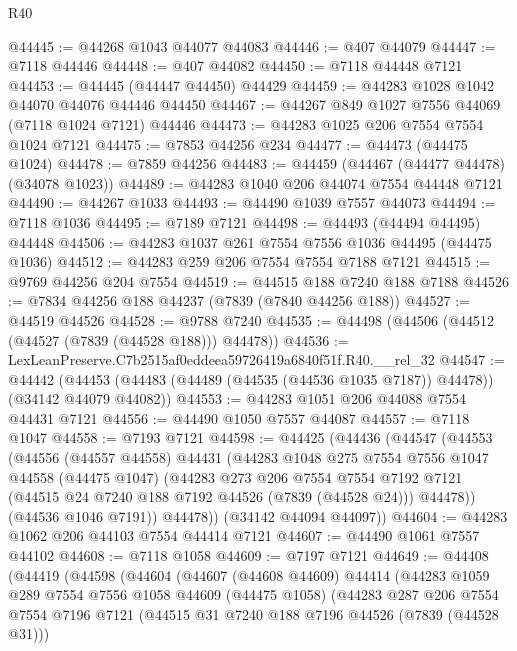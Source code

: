 \begin{lexlean}{R40}
\begin{coremodule}
@44445 := @44268 @1043 @44077 @44083
@44446 := @407 @44079
@44447 := @7118 @44446
@44448 := @407 @44082
@44450 := @7118 @44448 @7121
@44453 := @44445 (@44447 @44450) @44429
@44459 := @44283 @1028 @1042 @44070 @44076 @44446 @44450
@44467 := @44267 @849 @1027 @7556 @44069 (@7118 @1024 @7121) @44446
@44473 := @44283 @1025 @206 @7554 @7554 @1024 @7121
@44475 := @7853 @44256 @234
@44477 := @44473 (@44475 @1024)
@44478 := @7859 @44256
@44483 := @44459 (@44467 (@44477 @44478) (@34078 @1023))
@44489 := @44283 @1040 @206 @44074 @7554 @44448 @7121
@44490 := @44267 @1033
@44493 := @44490 @1039 @7557 @44073
@44494 := @7118 @1036
@44495 := @7189 @7121
@44498 := @44493 (@44494 @44495) @44448
@44506 := @44283 @1037 @261 @7554 @7556 @1036 @44495 (@44475 @1036)
@44512 := @44283 @259 @206 @7554 @7554 @7188 @7121
@44515 := @9769 @44256 @204 @7554
@44519 := @44515 @188 @7240 @188 @7188
@44526 := @7834 @44256 @188 @44237 (@7839 (@7840 @44256 @188))
@44527 := @44519 @44526
@44528 := @9788 @7240
@44535 := @44498 (@44506 (@44512 (@44527 (@7839 (@44528 @188))) @44478))
@44536 := LexLeanPreserve.C7b2515af0eddeea59726419a6840f51f.R40.__rel_32
@44547 := @44442
    (@44453 (@44483 (@44489 (@44535 (@44536 @1035 @7187)) @44478)) (@34142 @44079 @44082))
@44553 := @44283 @1051 @206 @44088 @7554 @44431 @7121
@44556 := @44490 @1050 @7557 @44087
@44557 := @7118 @1047
@44558 := @7193 @7121
@44598 := @44425
    (@44436
      (@44547
        (@44553
          (@44556
            (@44557 @44558)
            @44431
            (@44283
              @1048
              @275
              @7554
              @7556
              @1047
              @44558
              (@44475 @1047)
              (@44283
                @273
                @206
                @7554
                @7554
                @7192
                @7121
                (@44515 @24 @7240 @188 @7192 @44526 (@7839 (@44528 @24)))
                @44478))
            (@44536 @1046 @7191))
          @44478))
      (@34142 @44094 @44097))
@44604 := @44283 @1062 @206 @44103 @7554 @44414 @7121
@44607 := @44490 @1061 @7557 @44102
@44608 := @7118 @1058
@44609 := @7197 @7121
@44649 := @44408
    (@44419
      (@44598
        (@44604
          (@44607
            (@44608 @44609)
            @44414
            (@44283
              @1059
              @289
              @7554
              @7556
              @1058
              @44609
              (@44475 @1058)
              (@44283
                @287
                @206
                @7554
                @7554
                @7196
                @7121
                (@44515 @31 @7240 @188 @7196 @44526 (@7839 (@44528 @31)))

\end{coremodule}
\end{lexlean}
